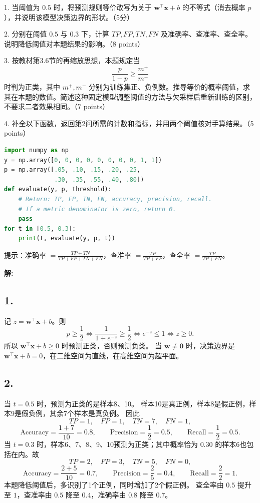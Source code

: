 \documentclass[10pt]{article}
\begin{document}
1. 当阈值为 $0.5$ 时，将预测规则等价改写为关于 $\mathbf{w}^{\top}\mathbf{x}+b$ 的不等式（消去概率 $p$），并说明该模型决策边界的形状。（5分）


2. 分别在阈值 $0.5$ 与 $0.3$ 下，计算 $TP,FP,TN,FN$ 及准确率、查准率、查全率。说明降低阈值对本题结果的影响。（8 points）

3. 按教材第3.6节的再缩放思想，本题规定当
\[
\frac{p}{1-p}\geq\frac{m^+}{m^-}
\]
时判为正类，其中 $m^+,m^-$ 分别为训练集正、负例数。推导等价的概率阈值，求其在本题的数值。简述这种固定模型调整阈值的方法与欠采样后重新训练的区别，不要求二者效果相同。（7 points）

4. 补全以下函数，返回第2问所需的计数和指标，并用两个阈值核对手算结果。（5 points）
\begin{lstlisting}[language=Python,caption=分类评价代码框架]
import numpy as np
y = np.array([0, 0, 0, 0, 0, 0, 0, 0, 1, 1])
p = np.array([.05, .10, .15, .20, .25,
              .30, .35, .55, .40, .80])
def evaluate(y, p, threshold):
    # Return: TP, FP, TN, FN, accuracy, precision, recall.
    # If a metric denominator is zero, return 0.
    pass
for t in [0.5, 0.3]:
    print(t, evaluate(y, p, t))
\end{lstlisting}
\noindent 提示：准确率 $=\frac{TP+TN}{TP+FP+TN+FN}$，查准率 $=\frac{TP}{TP+FP}$，查全率 $=\frac{TP}{TP+FN}$。

\textbf{\large 解:}

\subsection*{1.}
记 $z=\mathbf w^{\top}\mathbf x+b$。则
\[
p\geq\frac12
\iff \frac{1}{1+e^{-z}}\geq\frac12
\iff e^{-z}\leq1
\iff z\geq0.
\]
所以 $\mathbf w^{\top}\mathbf x+b\geq0$ 时预测正类，否则预测负类。
当 $\mathbf w\neq\mathbf0$ 时，决策边界是
$\mathbf w^{\top}\mathbf x+b=0$，在二维空间为直线，在高维空间为超平面。

\subsection*{2.}
当 $t=0.5$ 时，预测为正类的是样本8、10。
样本10是真正例，样本8是假正例，样本9是假负例，其余7个样本是真负例。
因此
\[
TP=1,\quad FP=1,\quad TN=7,\quad FN=1,
\]
\[
\mathrm{Accuracy}=\frac{1+7}{10}=0.8,\qquad
\mathrm{Precision}=\frac{1}{2}=0.5,\qquad
\mathrm{Recall}=\frac{1}{2}=0.5.
\]
当 $t=0.3$ 时，样本6、7、8、9、10预测为正类；其中概率恰为
$0.30$ 的样本6也包括在内。故
\[
TP=2,\quad FP=3,\quad TN=5,\quad FN=0,
\]
\[
\mathrm{Accuracy}=\frac{2+5}{10}=0.7,\qquad
\mathrm{Precision}=\frac{2}{5}=0.4,\qquad
\mathrm{Recall}=\frac{2}{2}=1.
\]
本题降低阈值后，多识别了1个正例，同时增加了2个假正例。
查全率由 $0.5$ 提升至 $1$，查准率由 $0.5$ 降至 $0.4$，准确率由 $0.8$ 降至 $0.7$。
\end{document}
